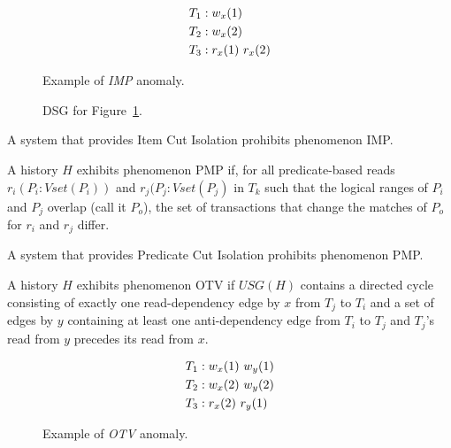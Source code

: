 \begin{figure}[H]
\begin{align*}
\small
T_1 &: w_x(1)\\
T_2 &: w_x(2)\\
T_3 &: r_x(1)~r_x(2)
\end{align*}
\caption{Example of \textit{IMP} anomaly.}
\label{fig:nici-history}
\end{figure}

\begin{figure}[H]
\centering
{}
\caption{DSG for Figure~\ref{fig:nici-history}.}
\label{fig:nici-dsg}
\end{figure}

\begin{definition}
A system that provides Item Cut Isolation prohibits phenomenon IMP.
\end{definition}

\begin{definition}
A history $H$ exhibits phenomenon PMP if, for all predicate-based
reads $r_i(P_i:Vset(P_i))$ and $r_j(P_j:Vset(P_j)$ in $T_k$ such that
the logical ranges of $P_i$ and $P_j$ overlap (call it $P_o$), the set
of transactions that change the matches of $P_o$ for $r_i$ and $r_j$
differ.
\end{definition}

\begin{definition}
A system that provides Predicate Cut Isolation prohibits phenomenon PMP.
\end{definition}

\begin{definition}
A history $H$ exhibits phenomenon OTV if $USG(H)$ contains a directed
cycle consisting of exactly one read-dependency edge by $x$ from $T_j$
to $T_i$ and a set of edges by $y$ containing at least one
anti-dependency edge from $T_i$ to $T_j$ and $T_j$'s read from $y$
precedes its read from $x$.
\end{definition}


\begin{figure}[H]
\begin{align*}
\small
T_1 &: w_x(1)~w_y(1)\\
T_2 &: w_x(2)~w_y(2)\\
T_3 &: r_x(2)~r_y(1)
\end{align*}
\caption{Example of \textit{OTV} anomaly.}
\label{fig:nta-history}
\end{figure}

